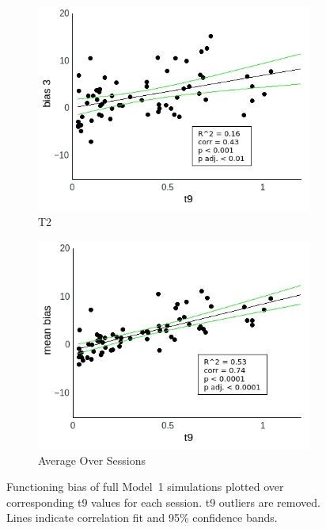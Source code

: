 \documentclass[a4paper]{scrreprt}
\begin{document}
\begin{figure}
\begin{subfigure}[b]{0.49\textwidth}
        \includegraphics[width=\textwidth]{figs/sec3/t9/t9no_diff_3_mod1mod1.jpeg}
        \caption{T2}
    \end{subfigure}
    \begin{subfigure}[b]{0.49\textwidth}
        \includegraphics[width=\textwidth]{figs/sec3/t9/t9no_diff_mean_mod1mod1.jpeg}
        \caption{Average Over Sessions}
    \end{subfigure}
\caption{Functioning bias of full Model~1 simulations plotted over corresponding t9 values for each session. t9 outliers are removed. Lines indicate correlation fit and 95\% confidence bands.}
\label{fig:t9no_diff_mod1mod1}
\end{figure}
\end{document}
